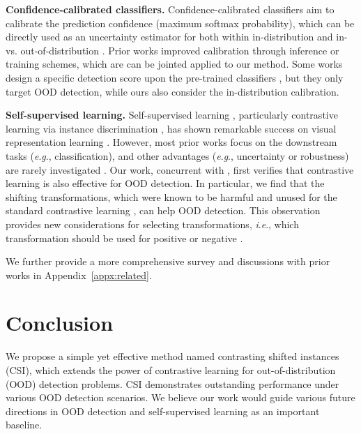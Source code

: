 \documentclass{article}
\newcommand{\ie}{\textit{i}.\textit{e}.}
\newcommand{\eg}{\textit{e}.\textit{g}.}
\begin{document}
\textbf{Confidence-calibrated classifiers.}
Confidence-calibrated classifiers aim to calibrate the prediction confidence (maximum softmax probability), which can be directly used as an uncertainty estimator for both within in-distribution \citep{naeini2015obtaining, guo2017calibration} and in- vs. out-of-distribution \citep{hendrycks2017baseline,lee2018training}. Prior works improved calibration through inference \citep{guo2017calibration} or training \citep{lee2018training} schemes, which are can be jointed applied to our method. Some works design a specific detection score upon the pre-trained classifiers \citep{liang2018enhancing,lee2018simple}, but they only target OOD detection, while ours also consider the in-distribution calibration.


\textbf{Self-supervised learning.}
Self-supervised learning \citep{gidaris2018unsupervised,kolesnikov2019revisiting}, particularly contrastive learning \citep{falcon2020framework} via instance discrimination \citep{wu2018unsupervised}, has shown remarkable success on visual representation learning \citep{he2019momentum,chen2020simple}. However, most prior works focus on the downstream tasks (\eg, classification), and other advantages (\eg, uncertainty or robustness) are rarely investigated \citep{hendrycks2019using_self,kim2020adversarial}. Our work, concurrent with \citep{liu2020hybrid,winkens2020contrastive}, first verifies that contrastive learning is also effective for OOD detection. In particular, we find that the shifting transformations, which were known to be harmful and unused for the standard contrastive learning \citep{chen2020simple}, can help OOD detection. This observation provides new considerations for selecting transformations, \ie, which transformation should be used for positive or negative \citep{tian2020makes,xiao2020should}. 


We further provide a more comprehensive survey and discussions with prior works in Appendix~\ref{appx:related}. \vspace{-0.06in}
\section{Conclusion}
\vspace{-0.06in}
\label{sec:conclusion}

We propose a simple yet effective method named contrasting shifted instances (CSI), which extends the power of contrastive learning for out-of-distribution (OOD) detection problems. CSI demonstrates outstanding performance under various OOD detection scenarios. We believe our work would guide various future directions in OOD detection and self-supervised learning as an important baseline.
\end{document}
